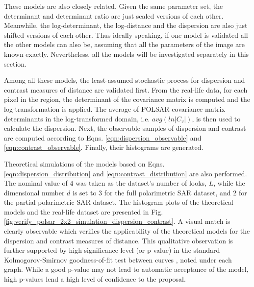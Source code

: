 These models are also closely related.
Given the same parameter set, the determinant and determinant ratio are just scaled versions of each other.
Meanwhile, the log-determinant, the log-distance and the dispersion are also just shifted versions of each other.
Thus ideally speaking,
  if one model is validated all the other models can also be,
  assuming that all the parameters of the image are known exactly.
Nevertheless, all the models will be investigated separately in this section.  

Among all these models, the least-assumed stochastic process for dispersion and contrast measures of distance are validated first.
From the real-life data, for each pixel in the region, the determinant of the covariance matrix is computed and the log-transformation is applied.
The average of POLSAR covariance matrix determinants in the log-transformed domain, i.e. $avg(ln|C_v|)$, is then used to calculate the dispersion. Next, the observable samples of dispersion and contrast are computed according to Eqns. \ref{eqn:dispersion_observable} and \ref{eqn:contrast_observable}. Finally,  their histograms are generated.

Theoretical simulations of the models based on Eqns. \ref{eqn:dispersion_distribution} and \ref{eqn:contrast_distribution} are also performed.
The nominal value of 4 was taken as the dataset's number of looks, $L$, while the
dimensional number $d$ is set to 3 for the full polarimetric SAR dataset, and 2 for the partial polarimetric SAR dataset. 
The histogram plots of the theoretical models and the real-life dataset are presented in Fig. \ref {fig:verify_polsar_2x2_simulation_dispersion_contrast}. A visual match is clearly observable which verifies the applicability of
the theoretical models for the dispersion and contrast measures of distance.
This qualitative observation is further supported by high significance level (or p-value) in the standard Kolmogorov-Smirnov goodness-of-fit test between curves \cite{Kolmogoroff_1941_AMS_461}, noted under each graph.
While a good p-value may not lead to automatic acceptance of the model, high p-values lend a high level of confidence to the proposal.

